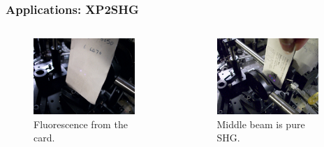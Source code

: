 \documentclass{beamer}
\begin{document}

\begin{frame}
\frametitle{Applications: XP2SHG}
\begin{columns}
\begin{figure}
\includegraphics[width=0.9\textwidth]{image-xp2_01}
\caption{Fluorescence from the card.}
\end{figure}
\begin{figure}
\includegraphics[width=0.9\textwidth]{image-xp2_02}
\caption{Middle beam is pure SHG.}
\end{figure}
\end{columns}
\end{frame}
\end{document}
